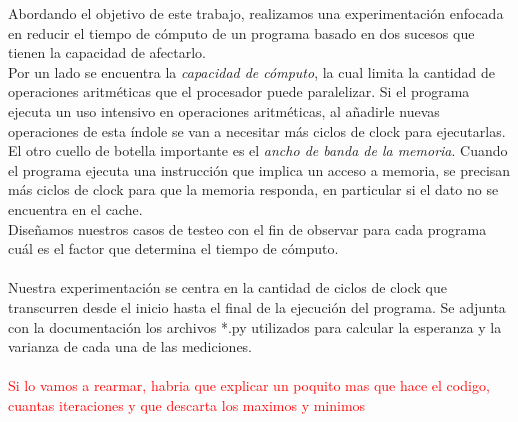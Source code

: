 \documentclass[a4paper]{article}
\begin{document}
\newpage
Abordando el objetivo de este trabajo, realizamos una experimentaci\'on enfocada en reducir el tiempo de c\'omputo de un programa basado en dos sucesos que tienen la capacidad de afectarlo. \\
\indent Por un lado se encuentra la \textit{capacidad de c\'omputo}, la cual limita la cantidad de operaciones aritm\'eticas que el procesador puede paralelizar. Si el programa ejecuta un uso intensivo en operaciones aritm\'eticas, al añadirle nuevas operaciones de esta \'indole se van a necesitar m\'as ciclos de clock para ejecutarlas. \\
\indent El otro cuello de botella importante es el \textit{ancho de banda de la memoria}. Cuando el programa ejecuta una instrucci\'on que implica un acceso a memoria, se precisan m\'as ciclos de clock para que la memoria responda, en particular si el dato no se encuentra en el cache.\\
\indent Diseñamos nuestros casos de testeo con el fin de observar para cada programa cu\'al es el factor que determina el tiempo de c\'omputo.\\
\\
\indent Nuestra experimentaci\'on se centra en la cantidad de ciclos de clock que transcurren desde el inicio hasta el final de la ejecuci\'on del programa. Se adjunta con la documentaci\'on los archivos *.py utilizados para calcular la esperanza y la varianza de cada una de las mediciones.\\
\\
\textcolor{red}{Si lo vamos a rearmar, habria que explicar un poquito mas que hace el codigo, cuantas iteraciones y que descarta los maximos y minimos}\\



%
%
%
\newpage
\end{document}
